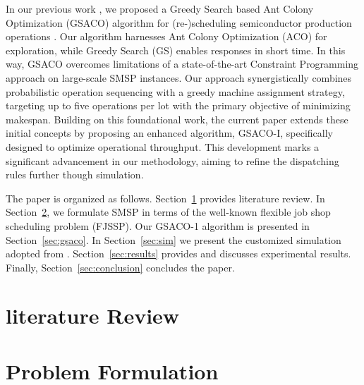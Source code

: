 \documentclass[runningheads]{llncs}
\begin{document}
In our previous work \cite{Ali2024}, we proposed a Greedy Search based Ant Colony Optimization (GSACO)
algorithm for (re-)scheduling semiconductor production operations \cite{Ali2024}. 
Our algorithm harnesses Ant Colony Optimization (ACO) \cite{Dorigo2019} for exploration, while
Greedy Search (GS) \cite{Papadimitriou} enables responses in short time. 
In this way, GSACO overcomes limitations of a state-of-the-art Constraint Programming approach \cite{Perron2023}
on large-scale SMSP instances. Our approach synergistically combines probabilistic operation sequencing with a greedy machine assignment strategy, targeting up to five operations per lot with the primary objective of minimizing makespan. Building on this foundational work, the current paper extends these initial concepts by proposing an enhanced algorithm, GSACO-I, specifically designed to optimize operational throughput. This development marks a significant advancement in our methodology, aiming to refine the dispatching rules further though simulation.

The paper is organized as follows. 
Section~\ref{sec:lit_rev} provides literature review.
In Section~\ref{sec:problem_f}, we formulate SMSP in terms of the well-known flexible job shop scheduling problem (FJSSP). 
Our GSACO-1 algorithm is presented in Section~\ref{sec:gsaco}.
In Section~\ref{sec:sim} we present the customized simulation adopted from \cite{Kovács2022}.
Section~\ref{sec:results} provides and discusses experimental results.
Finally, Section~\ref{sec:conclusion} concludes the paper.

\section{literature Review}
\label{sec:lit_rev}


\section{Problem Formulation}
\label{sec:problem_f}
\end{document}
